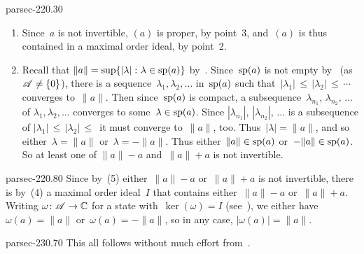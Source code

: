 \documentclass[b5page]{book}
\begin{document}
\begin{solution}{parsec-220.30}
\begin{enumerate}
Suppose that~$1\in(a)$.
If $0\nleq a\nleq 0$, then we have~$(a)=a\C$,
so~$a$ is a real scalar, which contradicts
$0\nleq a\nleq 0$.
So either~$0\leq a$ or~$a\leq 0$.
In any case,
since~$1\in (a)$,
we have~$1\in \Real{(a)}$,
and so $\lambda a\leq 1\leq \mu a$
for some~$\lambda,\mu\in \R$.
If~$a\geq 0$,
then~$1\leq \mu a$ entails that~$\mu\geq 0$, 
and
$\frac{1}{\mu}\leq a$,
so~$a$ is invertible, by~(6).
If~$a\leq 0$,
then~$1\leq \mu a$ entails that~$\mu\leq 0$,
and
$-\frac{1}{\mu} \leq -a$,
so~$-a$ is invertible,
thus $a$ is invertible too.
\item
Since~$a$ is not invertible,
$(a)$ is proper, by point~3,
and~$(a)$ is thus contained in a maximal order ideal, by point~2.
\item
Recall that $\|a\|=\sup\{\left|\lambda\right|\colon \lambda\in \mathrm{sp}(a)\}$
by~.
Since~$\mathrm{sp}(a)$ is not empty
by~ (as~$\mathscr{A}\neq\{0\}$),
there is a sequence~$\lambda_1,\lambda_2,\dotsc$
in~$\mathrm{sp}(a)$
such that~$\left|\lambda_1\right|\,\leq\,
\left|\lambda_2\right|\,\leq\,
\dotsb$ converges to~$\|a\|$.
Then since~$\mathrm{sp}(a)$ is compact,
a subsequence~$\lambda_{n_1},\,\lambda_{n_2},\,\dotsc$
of  $\lambda_1,\lambda_2,\dotsc$
converges to some~$\lambda\in\mathrm{sp}(a)$.
Since $\left|\lambda_{n_1}\right|,\,\left|\lambda_{n_2}\right|,\,\dotsc$
is a subsequence of 
$\left|\lambda_1\right|\,\leq\,
\left|\lambda_2\right|\,\leq\,$
it must converge to~$\|a\|$, too.
Thus~$\left|\lambda\right|=\|a\|$,
and so either~$\lambda=\|a\|$ or~$\lambda=-\|a\|$.
Thus either~$\|a\|\in \mathrm{sp}(a)$
or~$-\|a\|\in \mathrm{sp}(a)$.
So at least one of
$\|a\|-a$ and~$\|a\|+a$
is not invertible.
\end{enumerate}
\end{solution}
\begin{solution}{parsec-220.80}
Since by~(5)
either~$\|a\|-a$ or~$\|a\|+a$ is not invertible,
there is
by~(4)
a maximal order ideal~$I$
that contains either~$\|a\|-a$
or~$\|a\|+a$.
Writing $\omega\colon\mathscr{A}\to\mathbb{C}$
for a state
with~$\ker(\omega)=I$
(see~),
we either have~$\omega(a)=\|a\|$
or~$\omega(a)=-\|a\|$,
so in any case, $\left|\omega(a)\right|=\|a\|$.
\end{solution}
\begin{solution}{parsec-230.70}
This all follows without much effort from~.
\end{solution}
\end{document}
